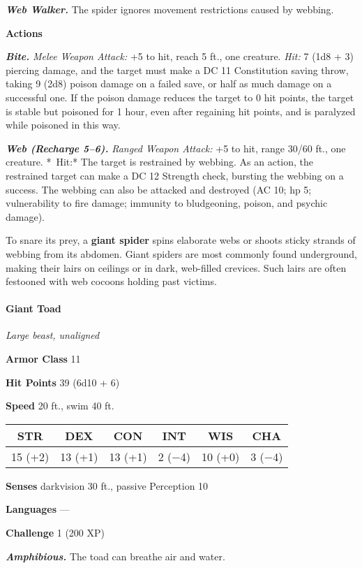 \documentclass[
]{article}
\begin{document}
\emph{\textbf{Web Walker.}} The spider ignores movement restrictions
caused by webbing.

\textbf{Actions}

\emph{\textbf{Bite.}} \emph{Melee Weapon Attack:} +5 to hit, reach 5
ft., one creature. \emph{Hit:} 7 (1d8 + 3) piercing damage, and the
target must make a DC 11 Constitution saving throw, taking 9 (2d8)
poison damage on a failed save, or half as much damage on a successful
one. If the poison damage reduces the target to 0 hit points, the target
is stable but poisoned for 1 hour, even after regaining hit points, and
is paralyzed while poisoned in this way.

\emph{\textbf{Web (Recharge 5--6).}} \emph{Ranged Weapon Attack:} +5 to
hit, range 30/60 ft., one creature. *~Hit:* The target is restrained by
webbing. As an action, the restrained target can make a DC 12 Strength
check, bursting the webbing on a success. The webbing can also be
attacked and destroyed (AC 10; hp 5; vulnerability to fire damage;
immunity to bludgeoning, poison, and psychic damage).

To snare its prey, a \textbf{giant spider} spins elaborate webs or
shoots sticky strands of webbing from its abdomen. Giant spiders are
most commonly found underground, making their lairs on ceilings or in
dark, web-filled crevices. Such lairs are often festooned with web
cocoons holding past victims.

\hypertarget{giant-toad}{%
\paragraph{Giant Toad}\label{giant-toad}}

\emph{Large beast, unaligned}

\textbf{Armor Class} 11

\textbf{Hit Points} 39 (6d10 + 6)

\textbf{Speed} 20 ft., swim 40 ft.

\begin{longtable}[]{@{}cccccc@{}}
\toprule
STR & DEX & CON & INT & WIS & CHA\tabularnewline
\midrule
\endhead
15 (+2) & 13 (+1) & 13 (+1) & 2 (−4) & 10 (+0) & 3 (−4)\tabularnewline
\bottomrule
\end{longtable}

\textbf{Senses} darkvision 30 ft., passive Perception 10

\textbf{Languages} ---

\textbf{Challenge} 1 (200 XP)

\emph{\textbf{Amphibious.}} The toad can breathe air and water.
\end{document}

